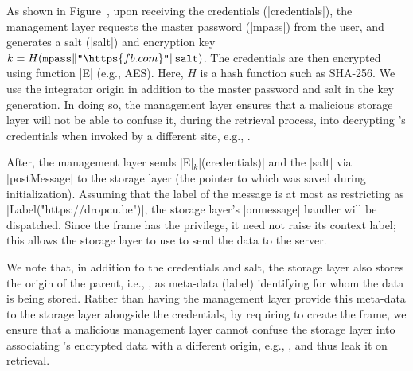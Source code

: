 As shown in Figure~, upon receiving the
credentials (\js|credentials|), the management layer requests the
master password (\js|mpass|) from the user, and generates a salt
(\js|salt|) and encryption key $k =
H(\texttt{mpass}\|\texttt{"}\https{fb.com}\texttt{"}\|\texttt{salt})$.
%
The credentials are then encrypted using function \js|E| (e.g., AES).
% 
Here, $H$ is a hash function such as SHA-256.
%
We use the integrator origin in addition to the master
password and salt in the key generation.
%
In doing so, the management layer ensures that a malicious storage
layer will not be able to confuse it, during the retrieval process,
into decrypting 's credentials when invoked by a
different site, e.g., .

After, the management layer sends \js|E|$_k$\js|(credentials)| and the
\js|salt| via \js|postMessage| to the storage layer (the pointer to
which was saved during initialization).
%
Assuming that the label of the message is at most as restricting as
\js|Label("https://dropcu.be")|, the storage layer's \js|onmessage|
handler will be dispatched. 
%
Since the frame has the  privilege, it need not raise
its context label; this allows the storage layer to use \xhr{} to send
the data to the server. 
 
We note that, in addition to the credentials and salt, the storage
layer also stores the origin of the parent, i.e., , as
meta-data (label) identifying for whom the data is being stored.
%
Rather than having the management layer provide this meta-data to the
storage layer alongside the credentials, by requiring 
to create the frame, we ensure that a malicious management layer
cannot confuse the storage layer into associating 's
encrypted data with a different origin, e.g., , and thus
leak it on retrieval.

